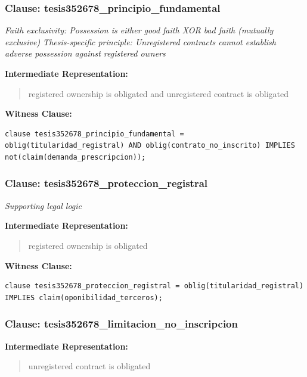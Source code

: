 \documentclass[11pt,a4paper]{article}
\begin{document}
\subsubsection{Clause: tesis352678\_principio\_fundamental}

\textit{Faith exclusivity: Possession is either good faith XOR bad faith (mutually exclusive) Thesis-specific principle: Unregistered contracts cannot establish adverse possession against registered owners}

\textbf{Intermediate Representation:}

\begin{quote}
registered ownership is obligated and unregistered contract is obligated
\end{quote}

\textbf{Witness Clause:}

\begin{lstlisting}[style=witnessstyle, language=Witness]
clause tesis352678_principio_fundamental = oblig(titularidad_registral) AND oblig(contrato_no_inscrito) IMPLIES not(claim(demanda_prescripcion));
\end{lstlisting}

\subsubsection{Clause: tesis352678\_proteccion\_registral}

\textit{Supporting legal logic}

\textbf{Intermediate Representation:}

\begin{quote}
registered ownership is obligated
\end{quote}

\textbf{Witness Clause:}

\begin{lstlisting}[style=witnessstyle, language=Witness]
clause tesis352678_proteccion_registral = oblig(titularidad_registral) IMPLIES claim(oponibilidad_terceros);
\end{lstlisting}

\subsubsection{Clause: tesis352678\_limitacion\_no\_inscripcion}

\textbf{Intermediate Representation:}

\begin{quote}
unregistered contract is obligated
\end{quote}
\end{document}
